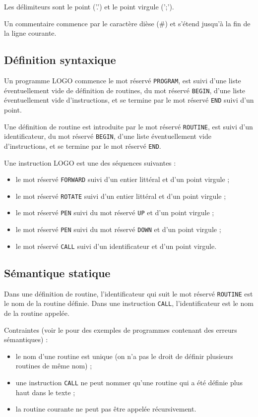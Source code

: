 Les délimiteurs sont le point ('.') et le point virgule (';').

Un commentaire commence par le caractère dièse (\#) et s'étend jusqu'à la fin de la ligne courante.


\subsection {Définition syntaxique}

Un programme LOGO commence le mot réservé \texttt{PROGRAM}, est suivi d'une liste éventuellement vide de définition de routines, du mot réservé \texttt{BEGIN}, d'une liste éventuellement vide d'instructions, et se termine par le mot réservé \texttt{END} suivi d'un point.

Une définition de routine est introduite par le mot réservé \texttt{ROUTINE}, est suivi d'un identificateur, du mot réservé \texttt{BEGIN}, d'une liste éventuellement vide d'instructions, et se termine par le mot réservé \texttt{END}.

Une instruction LOGO est une des séquences suivantes :
\begin{itemize}
  \item le mot réservé \texttt{FORWARD} suivi d'un entier littéral et d'un point virgule ;
  \item le mot réservé \texttt{ROTATE} suivi d'un entier littéral et d'un point virgule ;
  \item le mot réservé \texttt{PEN} suivi du mot réservé \texttt{UP} et d'un point virgule ;
  \item le mot réservé \texttt{PEN} suivi du mot réservé \texttt{DOWN} et d'un point virgule ;
  \item le mot réservé \texttt{CALL} suivi d'un identificateur et d'un point virgule.
\end{itemize}

\subsection{Sémantique statique}

Dans une définition de routine, l'identificateur qui suit le mot réservé \texttt{ROUTINE} est le nom de la routine définie. Dans une instruction \texttt{CALL}, l'identificateur est le nom de la routine appelée.

Contraintes (voir le  pour des exemples de programmes contenant des erreurs sémantiques) :
\begin{itemize}
  \item le nom d'une routine est unique (on n'a pas le droit de définir plusieurs routines de même nom) ;
  \item une instruction \texttt{CALL} ne peut nommer qu'une routine qui a été définie plus haut dans le texte ;
  \item la routine courante ne peut pas être appelée récursivement.
\end{itemize}


